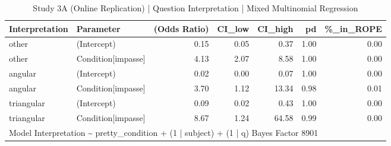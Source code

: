 \begin{table}

\caption{Study 3A (Online Replication) | Question Interpretation | Mixed Multinomial Regression}
\centering
\begin{tabular}[t]{l|l|r|r|r|r|r}
\hline
Interpretation & Parameter & (Odds Ratio) & CI\_low & CI\_high & pd & \%\_in\_ROPE\\
\hline
other & (Intercept) & 0.15 & 0.05 & 0.37 & 1.00 & 0.00\\
\hline
other & Condition[impasse] & 4.13 & 2.07 & 8.58 & 1.00 & 0.00\\
\hline
angular & (Intercept) & 0.02 & 0.00 & 0.07 & 1.00 & 0.00\\
\hline
angular & Condition[impasse] & 3.70 & 1.12 & 13.34 & 0.98 & 0.01\\
\hline
triangular & (Intercept) & 0.09 & 0.02 & 0.43 & 1.00 & 0.00\\
\hline
triangular & Condition[impasse] & 8.67 & 1.24 & 64.58 & 0.99 & 0.00\\
\hline
\multicolumn{7}{l}{\rule{0pt}{1em}Model Interpretation \textasciitilde{}  pretty\_condition + (1 | subject) + (1 | q) Bayes Factor  8901}\\
\end{tabular}
\end{table}
